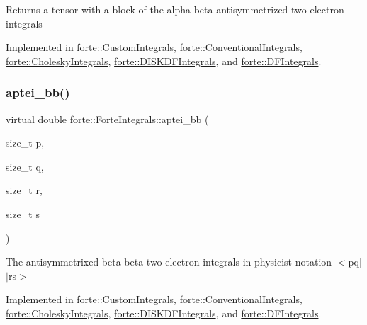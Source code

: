 \begin{DoxyReturn}{Returns}
a tensor with a block of the alpha-\/beta antisymmetrized two-\/electron integrals 
\end{DoxyReturn}


Implemented in \mbox{\hyperlink{classforte_1_1_custom_integrals_af65b7d58e92e6ec9a13c93238724a831}{forte\+::\+Custom\+Integrals}}, \mbox{\hyperlink{classforte_1_1_conventional_integrals_aeb46dfc0030e582c301b64a011e2af58}{forte\+::\+Conventional\+Integrals}}, \mbox{\hyperlink{classforte_1_1_cholesky_integrals_af9aff1a966a4e520aa4cc62afd1c6998}{forte\+::\+Cholesky\+Integrals}}, \mbox{\hyperlink{classforte_1_1_d_i_s_k_d_f_integrals_a3512219937aa98d2f0b6ee680254317a}{forte\+::\+D\+I\+S\+K\+D\+F\+Integrals}}, and \mbox{\hyperlink{classforte_1_1_d_f_integrals_a0c7391787d43e90df9a343a59bcadfbc}{forte\+::\+D\+F\+Integrals}}.

\mbox{\label{classforte_1_1_forte_integrals_a246225031c3799dc446f94e0e732c3ac}} 
\subsubsection{\texorpdfstring{aptei\+\_\+bb()}{aptei\_bb()}}
{\footnotesize\ttfamily virtual double forte\+::\+Forte\+Integrals\+::aptei\+\_\+bb (\begin{DoxyParamCaption}\item[{size\+\_\+t}]{p,  }\item[{size\+\_\+t}]{q,  }\item[{size\+\_\+t}]{r,  }\item[{size\+\_\+t}]{s }\end{DoxyParamCaption})\hspace{0.3cm}{\ttfamily [pure virtual]}}



The antisymmetrixed beta-\/beta two-\/electron integrals in physicist notation $<$pq$\vert$$\vert$rs$>$ 



Implemented in \mbox{\hyperlink{classforte_1_1_custom_integrals_a2f10a8117087972091b1a7b7188bf797}{forte\+::\+Custom\+Integrals}}, \mbox{\hyperlink{classforte_1_1_conventional_integrals_ae6d6bfe97bb42d74dc9b69b5c617a966}{forte\+::\+Conventional\+Integrals}}, \mbox{\hyperlink{classforte_1_1_cholesky_integrals_a02acd5ac863dcc1577c8b481ab80e8b6}{forte\+::\+Cholesky\+Integrals}}, \mbox{\hyperlink{classforte_1_1_d_i_s_k_d_f_integrals_a84224ddc5210cad49b63e74bdd1d4342}{forte\+::\+D\+I\+S\+K\+D\+F\+Integrals}}, and \mbox{\hyperlink{classforte_1_1_d_f_integrals_ac9c2cb326b43623cbb290f7d6e1738cb}{forte\+::\+D\+F\+Integrals}}.

